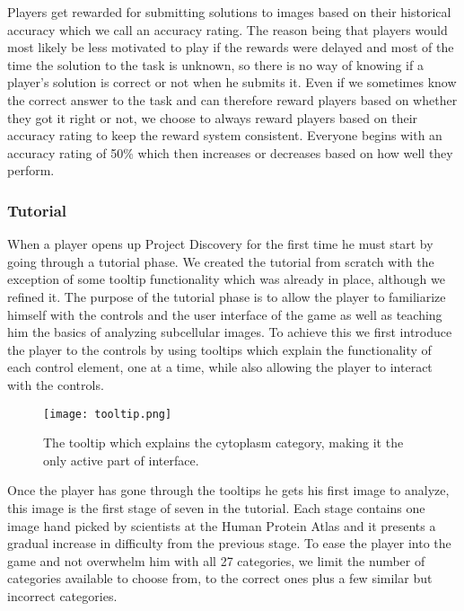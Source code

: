 	Players get rewarded for submitting solutions to images based on their historical accuracy which we call an accuracy rating. The reason being that players would most likely be less motivated to play if the rewards were delayed and most of the time the solution to the task is unknown, so there is no way of knowing if a player's solution is correct or not when he submits it. Even if we sometimes know the correct answer to the task and can therefore reward players based on whether they got it right or not, we choose to always reward players based on their accuracy rating to keep the reward system consistent. Everyone begins with an accuracy rating of 50\% which then increases or decreases based on how well they perform. 

	\subsubsection{Tutorial}
		When a player opens up Project Discovery for the first time he must start by going through a tutorial phase. We created the tutorial from scratch with the exception of some tooltip functionality which was already in place, although we refined it. The purpose of the tutorial phase is to allow the player to familiarize himself with the controls and the user interface of the game as well as teaching him the basics of analyzing subcellular images. To achieve this we first introduce the player to the controls by using tooltips which explain the functionality of each control element, one at a time, while also allowing the player to interact with the controls. 

		\begin{figure}[H]
		  \centering
		  \graphicspath{ {./graphics/} }
		  \centerline{\texttt{[image: tooltip.png]}}
		  \caption{\label{fig:tooltip}The tooltip which explains the cytoplasm category, making it the only active part of interface.}
		\end{figure}

		Once the player has gone through the tooltips he gets his first image to analyze, this image is the first stage of seven in the tutorial. Each stage contains one image hand picked by scientists at the Human Protein Atlas and it presents a gradual increase in difficulty from the previous stage. To ease the player into the game and not overwhelm him with all 27 categories, we limit the number of categories available to choose from, to the correct ones plus a few similar but incorrect categories.

